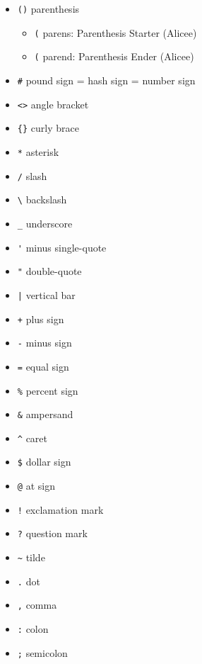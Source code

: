 
\begin{itemize}
\item \verb `()`	parenthesis
	\begin{itemize}
	\item \verb`(` parens: Parenthesis Starter (Alicee)
	\item \verb`(` parend: Parenthesis Ender (Alicee)
	\end{itemize}
\item \verb`#` 	pound sign = hash sign = number sign
\item \verb`<>` 	angle bracket 
\item \verb`{}`	curly brace
\item \verb`*`	asterisk
\item \verb`/`	slash 
\item \verb`\` 	backslash
\item \verb`_`	underscore
\item \verb`'`	minus single-quote
\item \verb`"`	double-quote
\item \verb`|`	vertical bar
\item \verb`+`	plus sign
\item \verb`-`	minus sign
\item \verb`=`	equal sign
\item \verb`%`	percent sign
\item \verb`&`	ampersand
\item \verb`^`	caret
\item \verb`$`	dollar sign
\item \verb`@`	at sign
\item \verb`!`	exclamation mark
\item \verb`?`	question mark
\item \verb`~`	tilde
\item \verb`.`	dot
\item \verb`,`	comma
\item \verb`:`	colon
\item \verb`;`	semicolon
\end{itemize}
